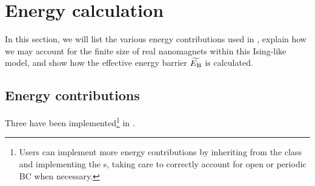 \newpage
\section{Energy calculation}\label{sec:2:Energy}
In this section, we will list the various energy contributions used in \hotspice, explain how we may account for the finite size of real nanomagnets within this Ising-like model, and show how the effective energy barrier $\widetilde{E_\mathrm{B}}$ is calculated.

\subsection{Energy contributions}
Three  have been implemented\footnote{
	Users can implement more energy contributions by inheriting from the  class and implementing the s, taking care to correctly account for open or periodic BC when necessary.
} in \hotspice.
